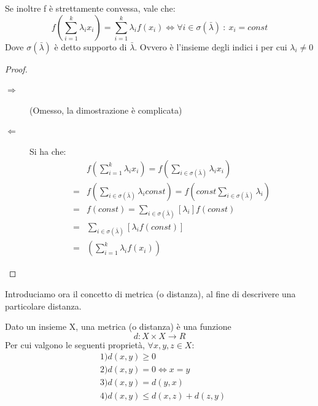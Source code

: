 \begin{corollario}
 Se inoltre f è strettamente convessa, vale che:
 \[
 f \left( \sum_{i=1}^k \lambda_i x_i \right) = \sum_{i=1}^k \lambda_i f(x_i) \iff \forall i \in \sigma(\bar{\lambda}) \ : \ x_i=const
 \]
 Dove $\sigma(\bar{\lambda})$ è detto supporto di $\bar{\lambda}$. Ovvero è l'insieme degli indici i per cui $\lambda_i \ne 0$
 \begin{proof}
 \mbox{}

  \begin{description}
   \item[\(\Longrightarrow\)] (Omesso, la dimostrazione è complicata)
   \item[\(\Longleftarrow\)] 
   Si ha che:
   \[\begin{split}
    & f \left( \sum_{i=1}^k \lambda_i x_i \right)=
    f \left( \sum_{i \in \sigma(\bar{\lambda}) } \lambda_i x_i \right) \\
    =& f \left( \sum_{i \in \sigma(\bar{\lambda}) } \lambda_i const \right)=
     f \left( const \sum_{i \in \sigma(\bar{\lambda}) } \lambda_i \right) \\
    =& f \left( const \right)= \sum_{i \in \sigma(\bar{\lambda}) } [\lambda_i] f \left( const \right) \\
    =& \sum_{i \in \sigma(\bar{\lambda}) } [\lambda_i f \left( const \right)] \\
    =& \left( \sum_{i=1}^k \lambda_i f(x_i) \right)
     \end{split}
   \]

  \end{description}
 \end{proof}
\end{corollario}

\bigskip

\noindent
Introduciamo ora il concetto di metrica (o distanza), al fine di descrivere una particolare distanza.

\begin{definizione}[Metrica]
 Dato un insieme X, una metrica (o distanza) è una funzione
\[
 d: X \times X \to R
\]
Per cui valgono le seguenti proprietà, $\forall x,y,z \in X$:
\[\begin{split}
 & 1) d(x,y) \ge 0 \\
 & 2) d(x,y)=0 \iff x=y \\
 & 3) d(x,y)=d(y,x) \\
 & 4) d(x,y) \le d(x,z)+d(z,y)
 \end{split}
\]
\end{definizione}

